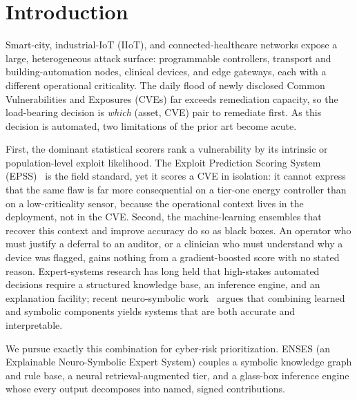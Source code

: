 \documentclass[journal]{IEEEtran}
\begin{document}
\section{Introduction}
\label{sec:intro}
Smart-city, industrial-IoT (IIoT), and connected-healthcare networks expose a
large, heterogeneous attack surface: programmable controllers, transport and
building-automation nodes, clinical devices, and edge gateways, each with a
different operational criticality. The daily flood of newly disclosed Common
Vulnerabilities and Exposures (CVEs) far exceeds remediation capacity, so the
load-bearing decision is \emph{which} (asset, CVE) pair to remediate first. As
this decision is automated, two limitations of the prior art become acute.

First, the dominant statistical scorers rank a vulnerability by its intrinsic
or population-level exploit likelihood. The Exploit Prediction Scoring System
(EPSS)~\cite{jacobs2021epss} is the field standard, yet it scores a CVE in
isolation: it cannot express that the same flaw is far more consequential on a
tier-one energy controller than on a low-criticality sensor, because the
operational context lives in the deployment, not in the CVE. Second, the
machine-learning ensembles that recover this context and improve accuracy do so
as black boxes. An operator who must justify a deferral to an auditor, or a
clinician who must understand why a device was flagged, gains nothing from a
gradient-boosted score with no stated reason. Expert-systems research has long
held that high-stakes automated decisions require a structured knowledge base,
an inference engine, and an explanation facility; recent neuro-symbolic
work~\cite{garcez2023neurosymbolic} argues that combining learned and symbolic
components yields systems that are both accurate and interpretable.

We pursue exactly this combination for cyber-risk prioritization. ENSES (an
Explainable Neuro-Symbolic Expert System) couples a symbolic knowledge graph
and rule base, a neural retrieval-augmented tier, and a glass-box inference
engine whose every output decomposes into named, signed contributions.
\end{document}
